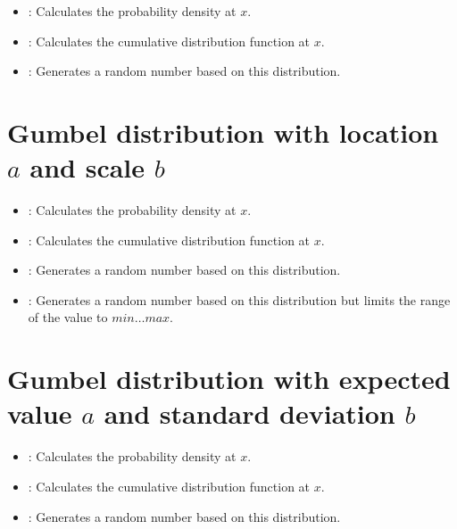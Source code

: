 \begin{itemize}

\item
{}:
Calculates the probability density at $x$.

\item
{}:
Calculates the cumulative distribution function at $x$.

\item
{}:
Generates a random number based on this distribution.

\end{itemize}



\section{Gumbel distribution with location \texorpdfstring{$a$}{a} and scale \texorpdfstring{$b$}{b}}

\begin{itemize}

\item
{}:
Calculates the probability density at $x$.

\item
{}:
Calculates the cumulative distribution function at $x$.

\item
{}:
Generates a random number based on this distribution.

\item
{}:
Generates a random number based on this distribution but limits the range of the value to $min\ldots max$.

\end{itemize}



\section{Gumbel distribution with expected value \texorpdfstring{$a$}{a} and standard deviation \texorpdfstring{$b$}{b}}

\begin{itemize}

\item
{}:
Calculates the probability density at $x$.

\item
{}:
Calculates the cumulative distribution function at $x$.

\item
{}:
Generates a random number based on this distribution.

\end{itemize}




